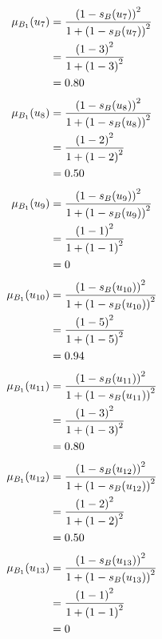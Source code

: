 \documentclass[a4paper,openany]{book}
\begin{document}
				\begin{align}
					\mu_{B_1}(u_7) &= \frac{\left(1-s_B(u_7)\right)^2}{1 + \left(1-s_B(u_7)\right)^2}\\
					&= \frac{\left(1-3\right)^2}{1 + \left(1-3\right)^2} \notag \\
					&= 0.80 \notag
				\end{align}
				\begin{align}
					\mu_{B_1}(u_8) &= \frac{\left(1-s_B(u_8)\right)^2}{1 + \left(1-s_B(u_8)\right)^2}\\
					&= \frac{\left(1-2\right)^2}{1 + \left(1-2\right)^2} \notag \\
					&= 0.50 \notag
				\end{align}
				\begin{align}
					\mu_{B_1}(u_9) &= \frac{\left(1-s_B(u_9)\right)^2}{1 + \left(1-s_B(u_9)\right)^2}\\
					&= \frac{\left(1-1\right)^2}{1 + \left(1-1\right)^2} \notag \\
					&= 0 \notag
				\end{align}
				\begin{align}
					\mu_{B_1}(u_{10}) &= \frac{\left(1-s_B(u_{10})\right)^2}{1 + \left(1-s_B(u_{10})\right)^2}\\
					&= \frac{\left(1-5\right)^2}{1 + \left(1-5\right)^2} \notag \\
					&= 0.94 \notag
				\end{align}
				\begin{align}
					\mu_{B_1}(u_{11}) &= \frac{\left(1-s_B(u_{11})\right)^2}{1 + \left(1-s_B(u_{11})\right)^2}\\
					&= \frac{\left(1-3\right)^2}{1 + \left(1-3\right)^2} \notag \\
					&= 0.80 \notag
				\end{align}
				\begin{align}
					\mu_{B_1}(u_{12}) &= \frac{\left(1-s_B(u_{12})\right)^2}{1 + \left(1-s_B(u_{12})\right)^2}\\
					&= \frac{\left(1-2\right)^2}{1 + \left(1-2\right)^2} \notag \\
					&= 0.50 \notag
				\end{align}
				\begin{align}
					\mu_{B_1}(u_{13}) &= \frac{\left(1-s_B(u_{13})\right)^2}{1 + \left(1-s_B(u_{13})\right)^2}\\
					&= \frac{\left(1-1\right)^2}{1 + \left(1-1\right)^2} \notag \\
					&= 0 \notag
				\end{align}
\end{document}
